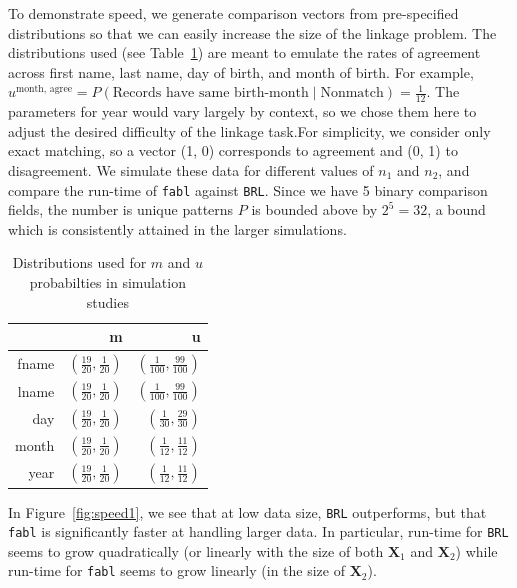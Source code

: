 \documentclass[12pt,letterpaper]{article}
\newcommand{\1}[1]{\mathbb{I}\!\left[#1\right]} %
\begin{document}
To demonstrate speed, we generate comparison vectors from pre-specified
distributions so that we can easily increase the size of the linkage
problem. The distributions used (see Table~\ref{Tab:distributions}) are meant to emulate the rates of agreement across first name, last name, day of birth, and month of birth.  For example, $u^{\text{month, agree}} = P(\text{Records have same birth-month} \mid \text{Nonmatch}) = \frac{1}{12}$. The parameters for year would vary largely by context, so we chose them here to adjust the desired difficulty of the linkage task.For simplicity, we consider only exact matching, so a vector (1, 0) corresponds to
agreement and (0, 1) to disagreement. We simulate these data for
different values of \(n_1\) and \(n_2\), and compare the run-time of
\texttt{fabl} against \texttt{BRL}. Since we have 5 binary comparison fields, the number is unique patterns \(P\) is bounded above by \(2^5 = 32\), a bound which is
consistently attained in the larger simulations.

\begin{table}[h!]
	\centering
	\begin{tabular}{rrr}
		\hline
		& m & u \\ 
		\hline
		fname & $\left(\frac{19}{20}, \frac{1}{20}\right)$ & $\left(\frac{1}{100}, \frac{99}{100}\right)$ \\ 
		lname & $\left(\frac{19}{20}, \frac{1}{20}\right)$ & $\left(\frac{1}{100}, \frac{99}{100}\right)$ \\ 
		day & $\left(\frac{19}{20}, \frac{1}{20}\right)$ & $\left(\frac{1}{30}, \frac{29}{30}\right)$ \\ 
		month & $\left(\frac{19}{20}, \frac{1}{20}\right)$ & $\left(\frac{1}{12}, \frac{11}{12}\right)$ \\ 
		year & $\left(\frac{19}{20}, \frac{1}{20}\right)$ & $\left(\frac{1}{12}, \frac{11}{12}\right)$ \\ 
		\hline
	\end{tabular}
	\caption{Distributions used for $m$ and $u$ probabilties in simulation studies}\label{Tab:distributions}
\end{table}

In Figure~\ref{fig:speed1}, we see that at low data size, \texttt{BRL} outperforms, but that
\texttt{fabl} is significantly faster at handling larger data. In
particular, run-time for \texttt{BRL} seems to grow quadratically (or
linearly with the size of both $\bm{X}_1$ and $\bm{X}_2$) while run-time for
\texttt{fabl} seems to grow linearly (in the size of $\bm{X}_2$).
\end{document}

